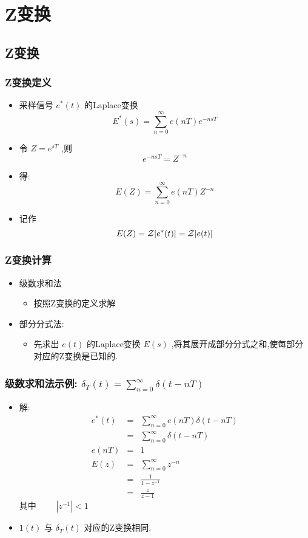 \documentclass[table]{beamer}
\begin{document}
\section{Z变换}
\label{sec-3}
\subsection{Z变换}
\label{sec-3-1}
\begin{frame}
\frametitle{Z变换定义}
\label{sec-3-1-1}

\begin{itemize}
\item 采样信号  $e^*(t)$  的Laplace变换  
       \[E^*(s)=\sum_{n=0}^{\infty}e(nT)e^{-nsT}\]
\item <2->令  $Z=e^{sT}$ ,则  
       \[e^{-nsT}=Z^{-n}\]
\item <3->得:  
       \[E(Z)=\sum_{n=0}^{\infty}e(nT)Z^{-n}\]
\item <3->记作  
       \[E(Z)={\cal Z}[e^*(t)]={\cal Z}[e(t)]\]
\end{itemize}
\end{frame}
\begin{frame}
\frametitle{Z变换计算}
\label{sec-3-1-2}

\begin{itemize}
\item 级数求和法
\begin{itemize}
\item 按照Z变换的定义求解
\end{itemize}
\item 部分分式法:
\begin{itemize}
\item 先求出  $e(t)$  的Laplace变换  $E(s)$  ,将其展开成部分分式之和,使每部分对应的Z变换是已知的.
\end{itemize}
\end{itemize}
\end{frame}
\begin{frame}
\frametitle{级数求和法示例: $\delta_T(t)=\sum_{n=0}^{\infty}\delta(t-nT)$}
\label{sec-3-1-3}

\begin{itemize}
\item <2->解:
      \begin{eqnarray*}
      e^*(t) & = & \sum_{n=0}^{\infty}e(nT)\delta(t-nT) \\
       &=& \sum_{n=0}^{\infty}\delta(t-nT) \\
      e(nT) &=& 1\\
      E(z) &=& \sum_{n=0}^{\infty}z^{-n}\\
       &=& \frac{1}{1-z^{-1}} \\
      &=& \frac{z}{z-1}
      \end{eqnarray*}
      其中 $\qquad |z^{-1}|<1$
\item <3->$1(t)$  与  $\delta_T(t)$  对应的Z变换相同.
\end{itemize}
\end{frame}
\end{document}
